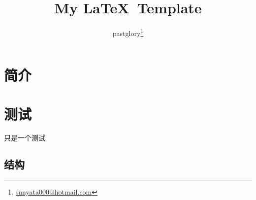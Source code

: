 \documentclass[zh]{pgreport}
\title {My \LaTeX\ Template}
\author{pastglory\thanks{\href{mailto:sunyata000@hotmail.com}{sunyata000@hotmail.com}}}
\date{}
\begin{document}
\maketitle
\tableofcontents
\begin{abstract}

\end{abstract}

\section{简介}


\section{测试}
只是一个测试

\subsection{结构}



\end{document}
